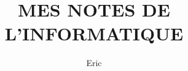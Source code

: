 \documentclass[openany]{book}
\begin{document}
\title{MES NOTES DE L'INFORMATIQUE}
\author{Eric}
\maketitle
\tableofcontents
\frontmatter



\end{document}
